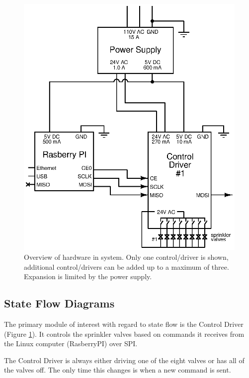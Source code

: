 \documentclass{article}
\begin{document}
\begin{figure}[h!]
\begin{center}
\includegraphics[scale=0.9]{xcircuit/hardware_overview}
\end{center}
\caption{Overview of hardware in system.
Only one control/driver is shown, 
additional control/drivers can be added up to a maximum of three.
Expansion is limited by the power supply.}
\label{fig:hwoview}
\end{figure}

\subsection{State Flow Diagrams}

The primary module of interest with regard to state flow is
the Control Driver (Figure \ref{fig:hwoview}).
It controls the sprinkler valves based on commands it receives
from the Linux computer (RasberryPI) over SPI.

The Control Driver is always either driving one of the eight valves
or has all of the valves off.
The only time this changes is when a new command is sent.
\end{document}
